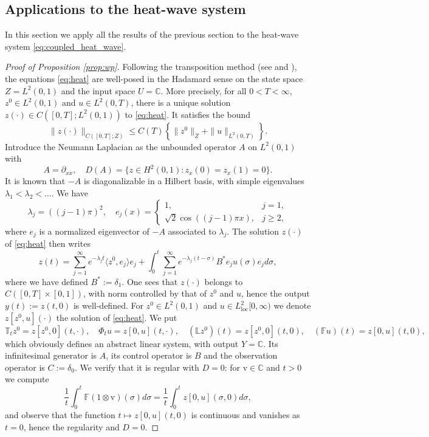 \documentclass[10pt]{article}
\newcommand{\oploc}{\operatorname{loc}}
\begin{document}
\subsection{Applications to the heat-wave system}\label{sec:applications}
In this section we apply all the results of the previous section to the heat-wave system \eqref{eq:coupled_heat_wave}. 
\begin{proof}[Proof of Proposition \ref{prop:wp}]
Following the transposition method (see \cite[Chapter 2]{Coron} and \cite[Section 10.2]{tucsnak2009observation}), the equations \eqref{eq:heat} are well-posed in the Hadamard sense on the state space $Z = L^2(0,1)$ and the input space $U = \mathbb{C}$. More precisely, for all $0 < T < \infty$, $z^0 \in L^2(0,1)$ and $u \in L^2(0,T)$, there is a unique solution $z(\cdot) \in C([0,T] ; L^2(0,1))$ to \eqref{eq:heat}. It satisfies the bound 
\[
\|z(\cdot)\|_{C([0,T];Z)} \leq C(T) \left\lbrace \|z^0\|_Z + \|u\|_{L^2(0,T)}\right\rbrace. 
\]
Introduce the Neumann Laplacian as the unbounded operator $A$ on $L^2(0,1)$ with
\[
A = \partial_{xx},\quad D(A) = \{ z \in H^2(0,1) : z_x(0) = z_x(1) = 0 \}.
\]
It is known that $-A$ is diagonalizable in a Hilbert basis, with simple eigenvalues $\lambda_1 < \lambda_2 < ...$. We have
\[
\lambda_j = ((j-1) \pi)^2,\quad e_j(x) = \left\lbrace \begin{array}{cc}
    1, & j = 1, \\
    \sqrt{2} \cos((j-1)\pi x), & j \geq 2,
\end{array}\right. 
\]
where $e_j$ is a normalized eigenvector of $-A$ associated to $\lambda_j$. The solution $z(\cdot)$ of \eqref{eq:heat} then writes 
\[
z(t) = \sum_{j=1}^\infty e^{-\lambda_j t} \langle z^0,e_j \rangle e_j + \int_0^t \sum_{j=1}^\infty e^{-\lambda_j (t-\sigma)} B^*e_j u(\sigma)   e_j d\sigma,
 \]
where we have defined $B^* := \delta_1$. One sees that $z(\cdot)$ belongs to $C([0,T] \times [0,1])$, with norm controlled by that of $z^0$ and $u$, hence the output $y(t) := z(t,0)$ is well-defined. For $z^0 \in L^2(0,1)$ and $u \in L^2_{\oploc}[0,\infty)$ we denote $z[z^0,u](\cdot)$ the solution of \eqref{eq:heat}. We put 
\[
\mathbb{T}_t z^0 = z[z^0,0](t,\cdot),\quad \Phi_t u = z[0,u](t,\cdot),\quad (\mathbb{L} z^0)(t) = z[z^0,0](t,0),\quad (\mathbb{F} u) (t) = z[0,u](t,0),
\]
which obviously defines an abstract linear system, with output $Y = \mathbb{C}$. Its infinitesimal generator is $A$, its control operator is $B$ and the observation operator is $C := \delta_0$. We verify that it is regular with $D = 0$: for $\mathrm{v} \in \mathbb{C}$ and $t > 0$ we compute 
\[
\frac{1}{t}\int_0^t \mathbb{F}(1 \otimes \mathrm{v})(\sigma)d\sigma = \frac{1}{t} \int_0^t z[0,u](\sigma,0)d\sigma,
\] 
and observe that the function $t \mapsto z[0,u](t,0)$ is continuous and vanishes as $t = 0$, hence the regularity and $D = 0$. 



\end{proof}
\end{document}
